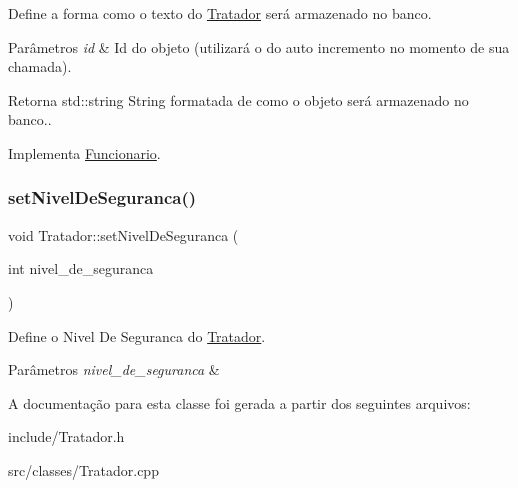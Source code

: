 Define a forma como o texto do \hyperlink{classTratador}{Tratador} será armazenado no banco. 


\begin{DoxyParams}{Parâmetros}
{\em id} & Id do objeto (utilizará o do auto incremento no momento de sua chamada). \\
\hline
\end{DoxyParams}
\begin{DoxyReturn}{Retorna}
std\+::string String formatada de como o objeto será armazenado no banco.. 
\end{DoxyReturn}


Implementa \hyperlink{classFuncionario_a696332cf5ccde3a31f84e5af687e7ec2}{Funcionario}.

\mbox{\label{classTratador_a508aa328b9235c262c74064c95357976}} 
\subsubsection{\texorpdfstring{set\+Nivel\+De\+Seguranca()}{setNivelDeSeguranca()}}
{\footnotesize\ttfamily void Tratador\+::set\+Nivel\+De\+Seguranca (\begin{DoxyParamCaption}\item[{int}]{nivel\+\_\+de\+\_\+seguranca }\end{DoxyParamCaption})}



Define o Nivel De Seguranca do \hyperlink{classTratador}{Tratador}. 


\begin{DoxyParams}{Parâmetros}
{\em nivel\+\_\+de\+\_\+seguranca} & \\
\hline
\end{DoxyParams}


A documentação para esta classe foi gerada a partir dos seguintes arquivos\+:\begin{DoxyCompactItemize}
\item 
include/Tratador.\+h\item 
src/classes/Tratador.\+cpp\end{DoxyCompactItemize}
